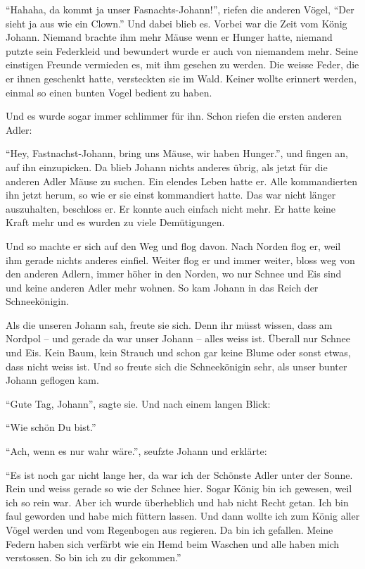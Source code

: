 \enquote{Hahaha, da kommt ja unser Fasnachts-Johann!}, riefen die anderen Vögel, \enquote{Der sieht ja aus wie ein Clown.} Und dabei blieb es. Vorbei war die Zeit vom König Johann. Niemand brachte ihm mehr Mäuse wenn er Hunger hatte, niemand putzte sein Federkleid und bewundert wurde er auch von niemandem mehr. Seine einstigen Freunde vermieden es, mit ihm gesehen zu werden. Die weisse Feder, die er ihnen geschenkt hatte, versteckten sie im Wald. Keiner wollte erinnert werden, einmal so einen bunten Vogel bedient zu haben. 

Und es wurde sogar immer schlimmer für ihn. Schon riefen die ersten anderen Adler:

\enquote{Hey, Fastnachst-Johann, bring uns Mäuse, wir haben Hunger.}, und fingen an, auf ihn einzupicken. Da blieb Johann nichts anderes übrig, als jetzt für die anderen Adler Mäuse zu suchen. Ein elendes Leben hatte er. Alle kommandierten ihn jetzt herum, so wie er sie einst kommandiert hatte. Das war nicht länger auszuhalten, beschloss er. Er konnte auch einfach nicht mehr. Er hatte keine Kraft mehr und es wurden zu viele Demütigungen.

Und so machte er sich auf den Weg und flog davon. Nach Norden flog er, weil ihm gerade nichts anderes einfiel. Weiter flog er und immer weiter, bloss weg von den anderen Adlern, immer höher in den Norden, wo nur Schnee und Eis sind und keine anderen Adler mehr wohnen. So kam Johann in das Reich der Schneekönigin.

Als die unseren Johann sah, freute sie sich. Denn ihr müsst wissen, dass am Nordpol -- und gerade da war unser Johann -- alles weiss ist. Überall nur Schnee und Eis. Kein Baum, kein Strauch und schon gar keine Blume oder sonst etwas, dass nicht weiss ist. Und so freute sich die Schneekönigin sehr, als unser bunter Johann geflogen kam. 

\enquote{Gute Tag, Johann}, sagte sie. Und nach einem langen Blick: 

\enquote{Wie schön Du bist.} 

\enquote{Ach, wenn es nur wahr wäre.}, seufzte Johann und erklärte: 

\enquote{Es ist noch gar nicht lange her, da war ich der Schönste Adler unter der Sonne. Rein und weiss gerade so wie der Schnee hier. Sogar König bin ich gewesen, weil ich so rein war. Aber ich wurde überheblich und hab nicht Recht getan. Ich bin faul geworden und habe mich füttern lassen. Und dann wollte ich zum König aller Vögel werden und vom Regenbogen aus regieren. Da bin ich gefallen. Meine Federn haben sich verfärbt wie ein Hemd beim Waschen und alle haben mich verstossen. So bin ich zu dir gekommen.}

